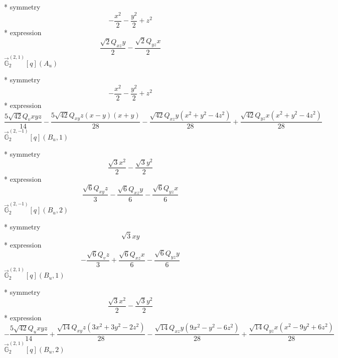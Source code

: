 \documentclass[fleqn,8pt]{jsarticle}
\begin{document}
\noindent\quad ** symmetry
\begin{dmath*}
- \frac{x^{2}}{2} - \frac{y^{2}}{2} + z^{2}
\end{dmath*}
\noindent\quad ** expression
\begin{dmath*}
\frac{\sqrt{2} Q_{xz} y}{2} - \frac{\sqrt{2} Q_{yz} x}{2}
\end{dmath*}
\noindent\quad $\vec{\mathbb{G}}_{2}^{(2,1)}[q](A_{u})$

\noindent\quad ** symmetry
\begin{dmath*}
- \frac{x^{2}}{2} - \frac{y^{2}}{2} + z^{2}
\end{dmath*}
\noindent\quad ** expression
\begin{dmath*}
\frac{5 \sqrt{42} Q_{v} x y z}{14} - \frac{5 \sqrt{42} Q_{xy} z \left(x - y\right) \left(x + y\right)}{28} - \frac{\sqrt{42} Q_{xz} y \left(x^{2} + y^{2} - 4 z^{2}\right)}{28} + \frac{\sqrt{42} Q_{yz} x \left(x^{2} + y^{2} - 4 z^{2}\right)}{28}
\end{dmath*}
\noindent\quad $\vec{\mathbb{G}}_{2}^{(2,-1)}[q](B_{u},1)$

\noindent\quad ** symmetry
\begin{dmath*}
\frac{\sqrt{3} x^{2}}{2} - \frac{\sqrt{3} y^{2}}{2}
\end{dmath*}
\noindent\quad ** expression
\begin{dmath*}
\frac{\sqrt{6} Q_{xy} z}{3} - \frac{\sqrt{6} Q_{xz} y}{6} - \frac{\sqrt{6} Q_{yz} x}{6}
\end{dmath*}
\noindent\quad $\vec{\mathbb{G}}_{2}^{(2,-1)}[q](B_{u},2)$

\noindent\quad ** symmetry
\begin{dmath*}
\sqrt{3} x y
\end{dmath*}
\noindent\quad ** expression
\begin{dmath*}
- \frac{\sqrt{6} Q_{v} z}{3} + \frac{\sqrt{6} Q_{xz} x}{6} - \frac{\sqrt{6} Q_{yz} y}{6}
\end{dmath*}
\noindent\quad $\vec{\mathbb{G}}_{2}^{(2,1)}[q](B_{u},1)$

\noindent\quad ** symmetry
\begin{dmath*}
\frac{\sqrt{3} x^{2}}{2} - \frac{\sqrt{3} y^{2}}{2}
\end{dmath*}
\noindent\quad ** expression
\begin{dmath*}
- \frac{5 \sqrt{42} Q_{u} x y z}{14} + \frac{\sqrt{14} Q_{xy} z \left(3 x^{2} + 3 y^{2} - 2 z^{2}\right)}{28} - \frac{\sqrt{14} Q_{xz} y \left(9 x^{2} - y^{2} - 6 z^{2}\right)}{28} + \frac{\sqrt{14} Q_{yz} x \left(x^{2} - 9 y^{2} + 6 z^{2}\right)}{28}
\end{dmath*}
\noindent\quad $\vec{\mathbb{G}}_{2}^{(2,1)}[q](B_{u},2)$
\end{document}
